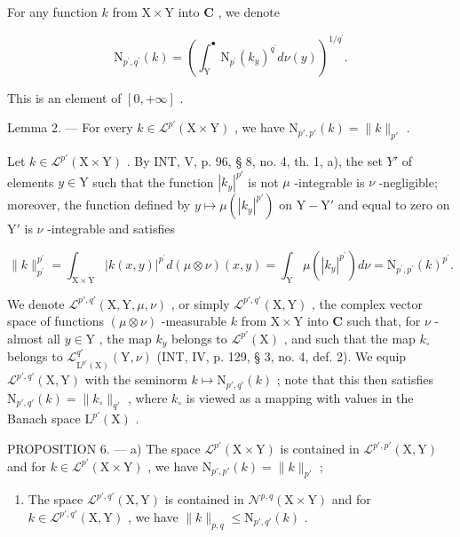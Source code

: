 For any function \(k\) from \(\mathrm{X} \times \mathrm{Y}\) into \(\mathbf{C}\) , we denote

\[
\mathrm{N} _ {p ^ {\prime}, q ^ {\prime}} (k) = \left(\int_ {\mathrm{Y}} ^ {\bullet} \mathrm{N} _ {p ^ {\prime}} (k _ {y}) ^ {q ^ {\prime}} d \nu (y)\right) ^ {1 / q ^ {\prime}}.
\]

This is an element of \([0, +\infty]\) .

Lemma 2. --- For every \(k \in \mathcal{L}^{p'}(\mathrm{X} \times \mathrm{Y})\) , we have \(\mathrm{N}_{p', p'}(k) = \| k \|_{p'}\) .

Let \(k \in \mathcal{L}^{p'}(\mathrm{X} \times \mathrm{Y})\) . By INT, V, p. 96, § 8, no. 4, th. 1, a), the set \(Y'\) of elements \(y \in \mathrm{Y}\) such that the function \(|k_y|^{p'}\) is not \(\mu\) -integrable is \(\nu\) -negligible; moreover, the function defined by \(y \mapsto \mu(|k_y|^{p'})\) on \(\mathrm{Y} - \mathrm{Y}'\) and equal to zero on \(\mathrm{Y}'\) is \(\nu\) -integrable and satisfies

\[
\| k \| _ {p ^ {\prime}} ^ {p ^ {\prime}} = \int_ {\mathrm{X} \times \mathrm{Y}} | k (x, y) | ^ {p ^ {\prime}} d (\mu \otimes \nu) (x, y) = \int_ {\mathrm{Y}} \mu (| k _ {y} | ^ {p ^ {\prime}}) d \nu = \mathrm{N} _ {p ^ {\prime}, p ^ {\prime}} (k) ^ {p ^ {\prime}}.
\]

We denote \(\mathcal{L}^{p',q'}(\mathrm{X},\mathrm{Y},\mu,\nu)\) , or simply \(\mathcal{L}^{p',q'}(\mathrm{X},\mathrm{Y})\) , the complex vector space of functions \((\mu\otimes\nu)\) -measurable \(k\) from \(\mathrm{X}\times\mathrm{Y}\) into \(\mathbf{C}\) such that, for \(\nu\) -almost all \(y\in\mathrm{Y}\) , the map \(k_y\) belongs to \(\mathcal{L}^{p'}(\mathrm{X})\) , and such that the map \(k_\circ\) belongs to \(\mathcal{L}^{q'}_{\mathrm{L}^{p'}(\mathrm{X})}(\mathrm{Y},\nu)\) (INT, IV, p. 129, § 3, no. 4, def. 2). We equip \(\mathcal{L}^{p',q'}(\mathrm{X},\mathrm{Y})\) with the seminorm \(k\mapsto\mathrm{N}_{p',q'}(k)\) ; note that this then satisfies \(\mathrm{N}_{p',q'}(k)=\|k_\circ\|_{q'}\) , where \(k_\circ\) is viewed as a mapping with values in the Banach space \(\mathrm{L}^{p'}(\mathrm{X})\) .

PROPOSITION 6. --- a) The space \(\mathcal{L}^{p'}(\mathrm{X} \times \mathrm{Y})\) is contained in \(\mathcal{L}^{p',p'}(\mathrm{X},\mathrm{Y})\) and for \(k \in \mathcal{L}^{p'}(\mathrm{X} \times \mathrm{Y})\) , we have \(\mathrm{N}_{p',p'}(k) = \| k\|_{p'}\) ;

\begin{enumerate}
\def\labelenumi{\alph{enumi})}
\setcounter{enumi}{1}
\tightlist
\item
  The space \(\mathcal{L}^{p',q'}(\mathrm{X},\mathrm{Y})\) is contained in \(\mathcal{N}^{p,q}(\mathrm{X}\times \mathrm{Y})\) and for \(k\in \mathcal{L}^{p',q'}(\mathrm{X},\mathrm{Y})\) , we have \(\| k\|_{p,q}\leqslant \mathrm{N}_{p',q'}(k)\) .
\end{enumerate}

